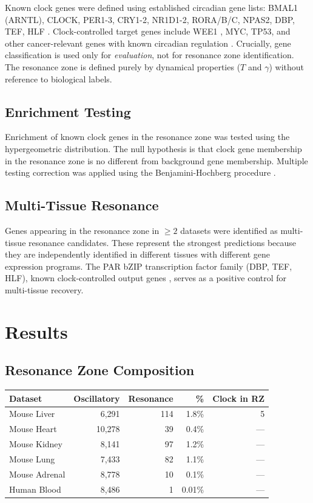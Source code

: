 \documentclass[11pt,letterpaper]{article}
\begin{document}
Known clock genes were defined using established circadian gene lists: BMAL1 (ARNTL), CLOCK, PER1-3, CRY1-2, NR1D1-2, RORA/B/C, NPAS2, DBP, TEF, HLF \citep{takahashi2017transcriptional, ko2006molecular, panda2002coordinated}. Clock-controlled target genes include WEE1 \citep{matsuo2003control}, MYC, TP53, and other cancer-relevant genes with known circadian regulation \citep{fu2003circadian}. Crucially, gene classification is used only for \textit{evaluation}, not for resonance zone identification. The resonance zone is defined purely by dynamical properties ($T$ and $\gamma$) without reference to biological labels.

\subsection{Enrichment Testing}

Enrichment of known clock genes in the resonance zone was tested using the hypergeometric distribution. The null hypothesis is that clock gene membership in the resonance zone is no different from background gene membership. Multiple testing correction was applied using the Benjamini-Hochberg procedure \citep{benjamini1995controlling}.

\subsection{Multi-Tissue Resonance}

Genes appearing in the resonance zone in $\geq 2$ datasets were identified as multi-tissue resonance candidates. These represent the strongest predictions because they are independently identified in different tissues with different gene expression programs. The PAR bZIP transcription factor family (DBP, TEF, HLF), known clock-controlled output genes \citep{gachon2006parbzip}, serves as a positive control for multi-tissue recovery.

\section{Results}

\subsection{Resonance Zone Composition}

\begin{center}
\begin{tabular}{lrrrr}
\toprule
\textbf{Dataset} & \textbf{Oscillatory} & \textbf{Resonance} & \textbf{\%} & \textbf{Clock in RZ} \\
\midrule
Mouse Liver & 6,291 & 114 & 1.8\% & 5 \\
Mouse Heart & 10,278 & 39 & 0.4\% & --- \\
Mouse Kidney & 8,141 & 97 & 1.2\% & --- \\
Mouse Lung & 7,433 & 82 & 1.1\% & --- \\
Mouse Adrenal & 8,778 & 10 & 0.1\% & --- \\
Human Blood & 8,486 & 1 & 0.01\% & --- \\
\bottomrule
\end{tabular}
\end{center}
\end{document}
